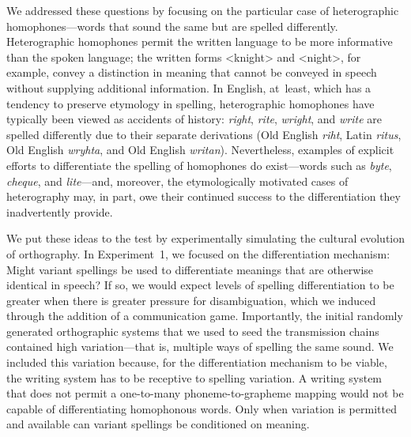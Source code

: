 \documentclass[doc,biblatex]{apa7}
\begin{document}
We addressed these questions by focusing on the particular case of heterographic homophones---words that sound the same but are spelled differently. Heterographic homophones permit the written language to be more informative than the spoken language; the written forms <knight> and <night>, for example, convey a distinction in meaning that cannot be conveyed in speech without supplying additional information. In English, at~least, which has a tendency to preserve etymology in spelling, heterographic homophones have typically been viewed as accidents of history: \textit{right}, \textit{rite}, \textit{wright}, and \textit{write} are spelled differently due to their separate derivations (Old English \textit{riht}, Latin \textit{ritus}, Old English \textit{wryhta}, and Old English \textit{writan}). Nevertheless, examples of explicit efforts to differentiate the spelling of homophones do exist---words such as \textit{byte}, \textit{cheque}, and \textit{lite}---and, moreover, the etymologically motivated cases of heterography may, in part, owe their continued success to the differentiation they inadvertently provide.

We put these ideas to the test by experimentally simulating the cultural evolution of orthography. In Experiment~1, we focused on the differentiation mechanism: Might variant spellings be used to differentiate meanings that are otherwise identical in speech? If so, we would expect levels of spelling differentiation to be greater when there is greater pressure for disambiguation, which we induced through the addition of a communication game. Importantly, the initial randomly generated orthographic systems that we used to seed the transmission chains contained high variation---that is, multiple ways of spelling the same sound. We included this variation because, for the differentiation mechanism to be viable, the writing system has to be receptive to spelling variation. A writing system that does not permit a one-to-many phoneme-to-grapheme mapping would not be capable of differentiating homophonous words. Only when variation is permitted and available can variant spellings be conditioned on meaning.
\end{document}
